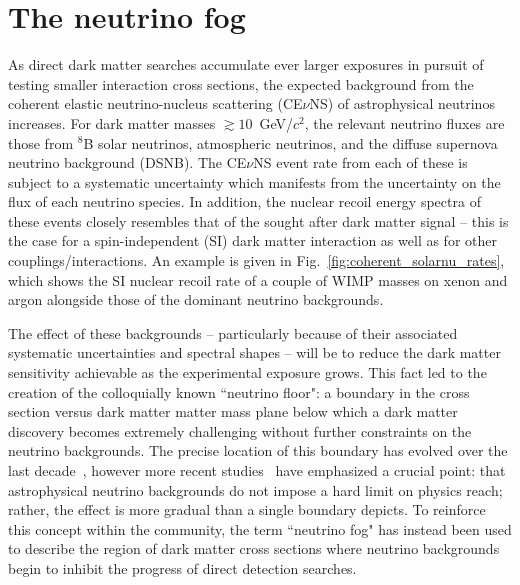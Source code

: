 \section{The neutrino fog}
\label{sec:neutrinofloor}

As direct dark matter searches accumulate ever larger exposures in pursuit of testing smaller interaction cross sections, the expected background from the coherent elastic neutrino-nucleus scattering (CE$\nu$NS) of astrophysical neutrinos increases. For dark matter masses $\gtrsim10$~GeV/$c^2$, the relevant neutrino fluxes are those from $^8$B solar neutrinos, atmospheric neutrinos, and the diffuse supernova neutrino background (DSNB). The CE$\nu$NS event rate from each of these is subject to a systematic uncertainty which manifests from the uncertainty on the flux of each neutrino species. In addition, the nuclear recoil energy spectra of these events closely resembles that of the sought after dark matter signal -- this is the case for a spin-independent (SI) dark matter interaction as well as for other couplings/interactions. An example is given in Fig.~\ref{fig:coherent_solarnu_rates}, which shows the SI nuclear recoil rate of a couple of WIMP masses on xenon and argon alongside those of the dominant neutrino backgrounds. 

The effect of these backgrounds -- particularly because of their associated systematic uncertainties and spectral shapes --  will be to reduce the dark matter sensitivity achievable as the experimental exposure grows. This fact led to the creation of the colloquially known ``neutrino floor": a boundary in the cross section versus dark matter matter mass plane below which a dark matter discovery becomes extremely challenging without further constraints on the neutrino backgrounds. The precise location of this boundary has evolved over the last decade~\cite{Billard:2013qya,Gelmini:2018ogy,OHare:2020lva,OHare:2021utq}, however more recent studies~\cite{OHare:2020lva,OHare:2021utq} have emphasized a crucial point: that astrophysical neutrino backgrounds do not impose a hard limit on physics reach; rather, the effect is more gradual than a single boundary depicts. To reinforce this concept within the community, the term ``neutrino fog" has instead been used to describe the region of dark matter cross sections where neutrino backgrounds begin to inhibit the progress of direct detection searches.


